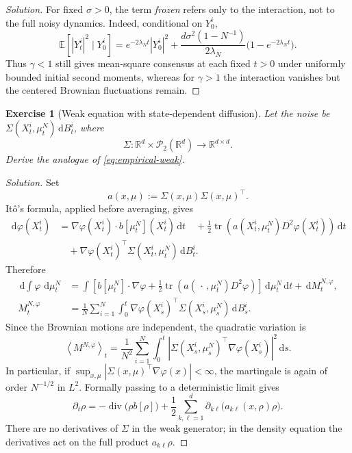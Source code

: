 \documentclass[11pt]{amsart}
\numberwithin{equation}{section}
\theoremstyle{plain}
\newtheorem{exercise}[theorem]{Exercise}
\newcommand{\R}{\mathbb{R}}
\newcommand{\E}{\mathbb{E}}
\newcommand{\cP}{\mathcal{P}}
\newcommand{\dd}{\,\mathrm{d}}
\newcommand{\abs}[1]{\left\lvert#1\right\rvert}
\DeclareMathOperator{\diver}{div}
\begin{document}
\begin{proof}[Solution]
For fixed $\sigma>0$, the term \emph{frozen} refers only to the interaction,
not to the full noisy dynamics.  Indeed, conditional on $Y_0^i$,
\[
 \E\!\left[\abs{Y_t^i}^2\mid Y_0^i\right]
 =e^{-2\lambda_Nt}\abs{Y_0^i}^2+{}
 \frac{d\sigma^2(1-N^{-1})}{2\lambda_N}
   \bigl(1-e^{-2\lambda_Nt}\bigr).
\]
Thus $\gamma<1$ still gives mean-square consensus at each fixed $t>0$ under
uniformly bounded initial second moments, whereas for $\gamma>1$ the
interaction vanishes but the centered Brownian fluctuations remain.
\end{proof}

\begin{exercise}[Weak equation with state-dependent diffusion]
Let the noise be $\Sigma(X_t^i,\mu_t^N)\dd B_t^i$, where
\[
 \Sigma:\R^d\times\cP_2(\R^d)\longrightarrow\R^{d\times d}.
\]
Derive the analogue of \eqref{eq:empirical-weak}.
\end{exercise}
\begin{proof}[Solution]
Set
\[
 a(x,\mu):=\Sigma(x,\mu)\Sigma(x,\mu)^\top.
\]
It\^o's formula, applied before averaging, gives
\begin{align*}
 \dd\varphi(X_t^i)
 &=\nabla\varphi(X_t^i)\cdot b[\mu_t^N](X_t^i)\dd t \quad+\frac12\operatorname{tr}\!\left(
 a(X_t^i,\mu_t^N)D^2\varphi(X_t^i)\right)\dd t\\
 &\quad+\nabla\varphi(X_t^i)^\top
 \Sigma(X_t^i,\mu_t^N)\dd B_t^i.
\end{align*}
Therefore
\begin{align}
 \dd\int\varphi\,\dd\mu_t^N
 &=\int\left[b[\mu_t^N]\cdot\nabla\varphi
 +\frac12\operatorname{tr}\!\left(a(\,\cdot\,,\mu_t^N)
 D^2\varphi\right)\right]\dd\mu_t^N\dd t
 +\dd M_t^{N,\varphi},\label{eq:state-dependent-weak}\\
 M_t^{N,\varphi}
 &=\frac1N\sum_{i=1}^N\int_0^t
 \nabla\varphi(X_s^i)^\top\Sigma(X_s^i,\mu_s^N)\dd B_s^i.
 \label{eq:state-dependent-martingale}
\end{align}
Since the Brownian motions are independent, the quadratic variation is
\begin{equation}\label{eq:state-dependent-bracket}
 \left\langle M^{N,\varphi}\right\rangle_t
 =\frac1{N^2}\sum_{i=1}^N\int_0^t
 \abs{\Sigma(X_s^i,\mu_s^N)^\top\nabla\varphi(X_s^i)}^2\dd s.
\end{equation}
In particular, if
$\sup_{x,\mu}\abs{\Sigma(x,\mu)^\top\nabla\varphi(x)}<\infty$, the martingale
is again of order $N^{-1/2}$ in $L^2$.  Formally passing to a deterministic
limit gives
\[
 \partial_t\rho
 =-\diver\bigl(\rho b[\rho]\bigr)
 +\frac12\sum_{k,\ell=1}^d
 \partial_{k\ell}\bigl(a_{k\ell}(x,\rho)\rho\bigr).
\]
There are no derivatives of $\Sigma$ in the weak generator; in the density
equation the derivatives act on the full product $a_{k\ell}\rho$.
\end{proof}
\end{document}
